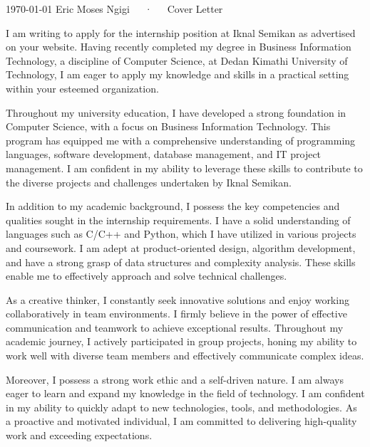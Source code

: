 \documentclass[11pt, a4paper]{configuration}
\begin{document}
\makecvheader[C]

\makecvfooter
  {\today}
  {Eric Moses Ngigi~~~·~~~Cover Letter}
  {}

\makelettertitle

\begin{cvletter}

I am writing to apply for the internship position at Iknal Semikan as advertised on your website. Having recently completed my degree in Business Information Technology, a discipline of Computer Science, at Dedan Kimathi University of Technology, I am eager to apply my knowledge and skills in a practical setting within your esteemed organization.

Throughout my university education, I have developed a strong foundation in Computer Science, with a focus on Business Information Technology. This program has equipped me with a comprehensive understanding of programming languages, software development, database management, and IT project management. I am confident in my ability to leverage these skills to contribute to the diverse projects and challenges undertaken by Iknal Semikan.

In addition to my academic background, I possess the key competencies and qualities sought in the internship requirements. I have a solid understanding of languages such as C/C++ and Python, which I have utilized in various projects and coursework. I am adept at product-oriented design, algorithm development, and have a strong grasp of data structures and complexity analysis. These skills enable me to effectively approach and solve technical challenges.

As a creative thinker, I constantly seek innovative solutions and enjoy working collaboratively in team environments. I firmly believe in the power of effective communication and teamwork to achieve exceptional results. Throughout my academic journey, I actively participated in group projects, honing my ability to work well with diverse team members and effectively communicate complex ideas.

Moreover, I possess a strong work ethic and a self-driven nature. I am always eager to learn and expand my knowledge in the field of technology. I am confident in my ability to quickly adapt to new technologies, tools, and methodologies. As a proactive and motivated individual, I am committed to delivering high-quality work and exceeding expectations.


\end{cvletter}
\end{document}
